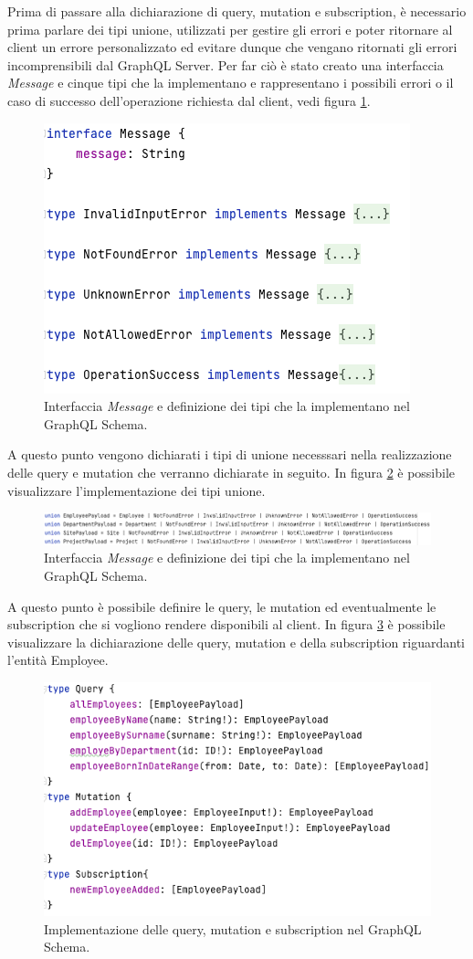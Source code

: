 Prima di passare alla dichiarazione di query, mutation e subscription, è necessario prima parlare dei tipi unione, utilizzati per gestire gli errori e poter ritornare al client un errore personalizzato ed evitare dunque che vengano ritornati gli errori incomprensibili dal GraphQL Server. Per far ciò è stato creato una interfaccia \textit{Message} e cinque tipi che la implementano e rappresentano i possibili errori o il caso di successo dell'operazione richiesta dal client, vedi figura \ref{message-interface}.
\FloatBarrier
\begin{figure}[!ht]
\centering
\includegraphics[width=0.6\linewidth]{immagini/messageInterface.png}
\caption{Interfaccia \textit{Message} e definizione dei tipi che la implementano nel GraphQL Schema.}
\label{message-interface}
\end{figure}
\FloatBarrier
A questo punto vengono dichiarati i tipi di unione necesssari nella realizzazione delle query e mutation che verranno dichiarate in seguito. In figura \ref{union-types} è possibile visualizzare l'implementazione dei tipi unione.
\FloatBarrier
\begin{figure}[!ht]
\centering
\includegraphics[width=1\linewidth]{immagini/unionType.png}
\caption{Interfaccia \textit{Message} e definizione dei tipi che la implementano nel GraphQL Schema.}
\label{union-types}
\end{figure}
\FloatBarrier
A questo punto è possibile definire le query, le mutation ed eventualmente le subscription che si vogliono rendere disponibili al client. In figura \ref{query-employee} è possibile visualizzare la dichiarazione delle query, mutation e della subscription riguardanti l'entità Employee.
\FloatBarrier
\begin{figure}[!ht]
\centering
\includegraphics[width=0.6\linewidth]{immagini/queryEmployee.png}
\caption{Implementazione delle query, mutation e subscription nel GraphQL Schema.}
\label{query-employee}
\end{figure}
